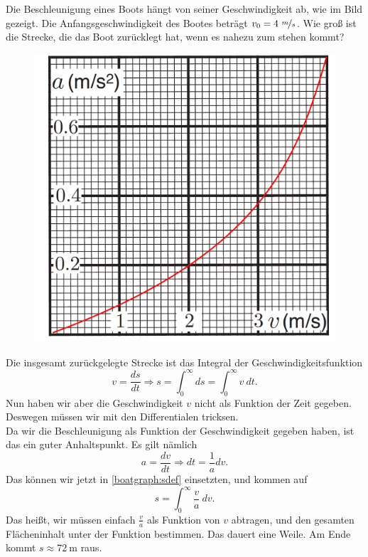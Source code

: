\begin{Exercise}[label = boatgraph, origin = Jaan Kalda, difficulty = 3, title = Bootsbewegung]
	Die Beschleunigung eines Boots hängt von seiner Geschwindigkeit ab, wie im Bild gezeigt. Die Anfangsgeschwindigkeit des Bootes beträgt $v_0 = 4~\nicefrac{m}{s}$. Wie groß ist die Strecke, die das Boot zurücklegt hat, wenn es nahezu zum stehen kommt?
\end{Exercise}
\begin{figure}[h]
	\centering
	\includegraphics[scale = 0.4]{../tasks/kalda/boatgraph1}
\end{figure}
\begin{Answer}[ref=boatgraph]
	Die insgesamt zurückgelegte Strecke ist das Integral der Geschwindigkeitsfunktion
	\begin{equation}\label{boatgraph:sdef}
		v = \frac{ds}{dt}\Rightarrow s = \int_{0}^{\infty}ds = \int_{0}^{\infty} v~dt.
	\end{equation}
	Nun haben wir aber die Geschwindigkeit $v$ nicht als Funktion der Zeit gegeben. Deswegen müssen wir mit den Differentialen tricksen.\\
	Da wir die Beschleunigung als Funktion der Geschwindigkeit gegeben haben, ist das ein guter Anhaltspunkt. Es gilt nämlich
	\begin{equation}\label{boatgraph:adef}
		a  = \frac{dv}{dt} \Rightarrow dt = \frac{1}{a} dv.
	\end{equation}
	Das können wir jetzt in \eqref{boatgraph:sdef} einsetzten, und kommen auf
	\begin{equation}
		s = \int_{0}^{\infty} \frac{v}{a}~dv.
	\end{equation}
	Das heißt, wir müssen einfach $\frac{v}{a}$ als Funktion von $v$ abtragen, und den gesamten Flächeninhalt unter der Funktion bestimmen. Das dauert eine Weile. Am Ende kommt $s\approx 72~\mathrm{m}$ raus.
\end{Answer}
